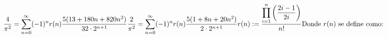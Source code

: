 \documentclass[preview]{standalone}
\begin{document}
\begin{align*}
\frac{4}{\pi^2} = \sum_{n=0}^{\infty} (-1)^n r(n) \frac{5(13 + 180n + 820n^2)}{32 \cdot 2^{n+1}}
\frac{2}{\pi^2} = \sum_{n=0}^{\infty} (-1)^n r(n) \frac{5(1 + 8n + 20n^2)}{2 \cdot 2^{n+1}}
 r(n) := \frac{\displaystyle\prod_{i=1}^{n} \left(\frac{2i-1}{2i}\right)}{n!} \newline
\text{Donde }r(n) \text{ se define como:}
\end{align*}
\end{document}
